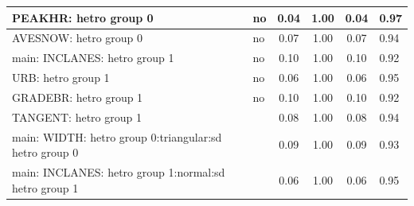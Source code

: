 \begin{table}
\begin{center}
\begin{tabular}{|l|l|c|c|c|l|}
			\hline
			PEAKHR: hetro group 0 & no & 0.04 & 1.00 & 0.04 & 0.97 \\
			\hline
			AVESNOW: hetro group 0 & no & 0.07 & 1.00 & 0.07 & 0.94 \\
			\hline
			main: INCLANES: hetro group 1 & no & 0.10 & 1.00 & 0.10 & 0.92 \\
			\hline
			URB: hetro group 1 & no & 0.06 & 1.00 & 0.06 & 0.95 \\
			\hline
			GRADEBR: hetro group 1 & no & 0.10 & 1.00 & 0.10 & 0.92 \\
			\hline
			TANGENT: hetro group 1 &  & 0.08 & 1.00 & 0.08 & 0.94 \\
			\hline
			main: WIDTH: hetro group 0:triangular:sd  hetro group 0 &  & 0.09 & 1.00 & 0.09 & 0.93 \\
			\hline
			main: INCLANES: hetro group 1:normal:sd  hetro group 1 &  & 0.06 & 1.00 & 0.06 & 0.95 \\
			\hline
		\end{tabular}
	\end{center}
\end{table}